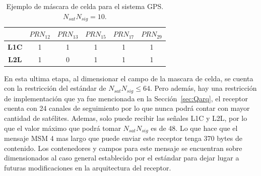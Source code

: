 \documentclass[a4paper,12pt,oneside,onecolumn,final,openright]{book}%
\begin{document}
\begin{table}[]
\centering
\begin{tabular}{|c|c|c|c|c|c|}
\hline
\rowcolor[HTML]{9B9B9B} 
\multicolumn{1}{|l|}{\cellcolor[HTML]{343434}\textbf{}} & \multicolumn{1}{l|}{\cellcolor[HTML]{9B9B9B}$PRN_{12}$} & \multicolumn{1}{l|}{\cellcolor[HTML]{9B9B9B}$PRN_{13}$} & \multicolumn{1}{l|}{\cellcolor[HTML]{9B9B9B}$PRN_{15}$} & \multicolumn{1}{l|}{\cellcolor[HTML]{9B9B9B}$PRN_{17}$} & \multicolumn{1}{l|}{\cellcolor[HTML]{9B9B9B}$PRN_{29}$} \\ \hline
\cellcolor[HTML]{9B9B9B}\textbf{L1C}                    & 1                                                       & 1                                                       & 1                                                       & 1                                                       & 1                                                       \\ \hline
\cellcolor[HTML]{9B9B9B}\textbf{L2L}                    & 1                                                       & 0                                                       & 1                                                       & 1                                                       & 1                                                       \\ \hline
\end{tabular}
\caption{Ejemplo de máscara de celda para el sistema GPS. $N_{sat}N_{sig} = 10$.}
\label{tab:cell_mask}
\end{table}

	En esta ultima etapa, al dimensionar el campo de la mascara de celda, se cuenta con la restricción del estándar de $N_{sat}N_{sig}\leq 64$. Pero además, hay una restricción de implementación que ya fue mencionada en la Sección~\ref{sec:Qarq}, el receptor cuenta con 24 canales de seguimiento por lo que nunca podrá contar con mayor cantidad de satélites. Ademas, solo puede recibir las señales L1C y L2L, por lo que el valor máximo que podrá tomar $N_{sat}N_{sig}$ es de 48. Lo que hace que el mensaje MSM 4 mas largo que puede enviar este receptor tenga 370 bytes de contenido. Los contenedores y campos para este mensaje se encuentran sobre dimensionados al caso general establecido por el estándar para dejar lugar a futuras modificaciones en la arquitectura del receptor.
	
\end{document}
